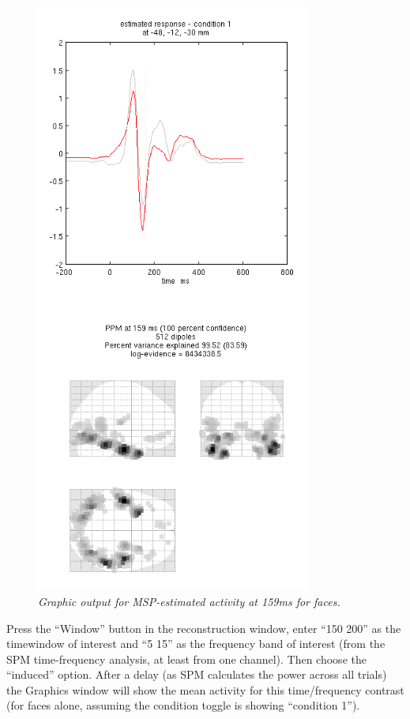 \begin{figure}
\begin{center}
\includegraphics[width=90mm]{multimodal/figures/meg_msp.png}
\caption{\em  Graphic output for MSP-estimated activity at 159ms for faces.\label{multimodal:fig:18}}
\end{center}
\end{figure}

Press the ``Window'' button in the reconstruction window, enter ``150 200'' as the timewindow of interest and ``5 15'' as the frequency band of interest (from the SPM time-frequency analysis, at least from one channel). Then choose the ``induced'' option. After a delay (as SPM calculates the power across all trials) the Graphics window will show the mean activity for this time/frequency contrast (for faces alone, assuming the condition toggle is showing ``condition 1'').

